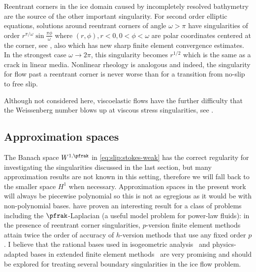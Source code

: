 Reentrant corners in the ice domain caused by incompletely resolved bathymetry are the source of the other important singularity.
For second order elliptic equations, solutions around reentrant corners of angle $\omega > \pi$ have singularities of order $r^{\pi/\omega}\sin\frac{\pi\phi}{\omega}$ where $(r,\phi), r < 0, 0 < \phi < \omega$ are polar coordinates centered at the corner, see \citet{grisvard1985elliptic,nazarov1994elliptic}, also \citet{bacuta2003regularity} which has new sharp finite element convergence estimates.
In the strongest case $\omega\to 2\pi$, this singularity becomes $r^{1/2}$ which is the same as a crack in linear media.
Nonlinear rheology is analogous and indeed, the singularity for flow past a reentrant corner is never worse than for a transition from no-slip to free slip.

Although not considered here, viscoelastic flows have the further difficulty that the Weissenberg number blows up at viscous stress singularities, see \citet{lipscomb1987implications,davies1988reentrant,hinch1993flow,owens2002cr}.

\subsection{Approximation spaces}\label{sssec:approximation}
The Banach space $W^{1,\pfrak}$ in \eqref{eq:slip:stokes-weak} has the correct regularity for investigating the singularities discussed in the last section, but many approximation results are not known in this setting, therefore we will fall back to the smaller space $H^1$ when necessary.
Approximation spaces in the present work will always be piecewise polynomial so this is not as egregious as it would be with non-polynomial bases.
\citet{ainsworth1999approximation} have proven an interesting result for a class of problems including the $\pfrak$-Laplacian (a useful model problem for power-law fluids): in the presence of reentrant corner singularities, $p$-version finite element methods attain twice the order of accuracy of $h$-version methods that use any fixed order $p$.
I believe that the rational bases used in isogeometric analysis~\citep{hughes2005isogeometric,cottrell2009isogeometric} and physics-adapted bases in extended finite element methods~\citep{belytschko2009review,mohammadi2008extended,elguedj2006extended,jiang2011singular} are very promising and should be explored for treating several boundary singularities in the ice flow problem.

